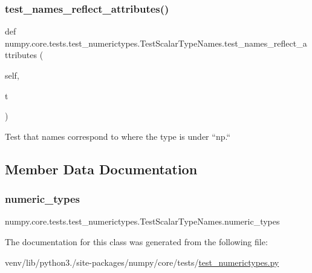 \subsubsection{\texorpdfstring{test\+\_\+names\+\_\+reflect\+\_\+attributes()}{test\_names\_reflect\_attributes()}}
{\footnotesize\ttfamily def numpy.\+core.\+tests.\+test\+\_\+numerictypes.\+Test\+Scalar\+Type\+Names.\+test\+\_\+names\+\_\+reflect\+\_\+attributes (\begin{DoxyParamCaption}\item[{}]{self,  }\item[{}]{t }\end{DoxyParamCaption})}

\begin{DoxyVerb}Test that names correspond to where the type is under ``np.`` \end{DoxyVerb}
 

\subsection{Member Data Documentation}
\mbox{\label{classnumpy_1_1core_1_1tests_1_1test__numerictypes_1_1TestScalarTypeNames_a41280593def27be3fc75a25884a29f4a}} 
\subsubsection{\texorpdfstring{numeric\+\_\+types}{numeric\_types}}
{\footnotesize\ttfamily numpy.\+core.\+tests.\+test\+\_\+numerictypes.\+Test\+Scalar\+Type\+Names.\+numeric\+\_\+types\hspace{0.3cm}{\ttfamily [static]}}



The documentation for this class was generated from the following file\+:\begin{DoxyCompactItemize}
\item 
venv/lib/python3./site-\/packages/numpy/core/tests/\hyperlink{test__numerictypes_8py}{test\+\_\+numerictypes.\+py}\end{DoxyCompactItemize}
